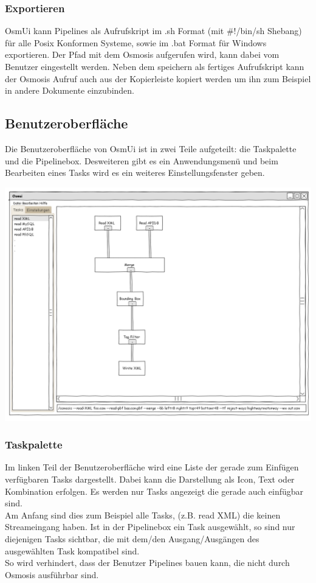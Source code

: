 \documentclass[a4paper,12pt]{scrartcl}
\begin{document}
\subsubsection{Exportieren}
OsmUi kann Pipelines als Aufrufskript im .sh Format (mit \#!/bin/sh Shebang) für alle Posix Konformen Systeme, sowie im .bat Format für Windows exportieren.
Der Pfad mit dem Osmosis aufgerufen wird, kann dabei vom Benutzer eingestellt werden. Neben dem speichern als fertiges Aufrufskript kann
der Osmosis Aufruf auch aus der Kopierleiste kopiert werden um ihn zum Beispiel in andere Dokumente einzubinden. 

\subsection{Benutzeroberfläche}
Die Benutzeroberfläche von OsmUi ist in zwei Teile aufgeteilt: die Taskpalette und die Pipelinebox. Desweiteren gibt es ein Anwendungsmenü und beim Bearbeiten eines Tasks
wird es ein weiteres Einstellungsfenster geben.\\
\begin{center}
\includegraphics[width=15cm]{ui_prototype/OsmUi_Startseite.png}
\end{center}
\subsubsection{Taskpalette}
Im linken Teil der Benutzeroberfläche wird eine Liste der gerade zum Einfügen verfügbaren Tasks dargestellt. Dabei kann die Darstellung als Icon,
Text oder Kombination erfolgen. Es werden nur Tasks angezeigt die gerade auch einfügbar sind. \\
Am Anfang sind dies zum Beispiel alle Tasks, (z.B. read XML) die keinen Streameingang haben. Ist in der Pipelinebox ein Task ausgewählt, so
sind nur diejenigen Tasks sichtbar, die mit dem/den Ausgang/Ausgängen des ausgewählten Task kompatibel sind.\\
So wird verhindert, dass der Benutzer Pipelines bauen kann, die nicht durch Osmosis ausführbar sind.
\end{document}
